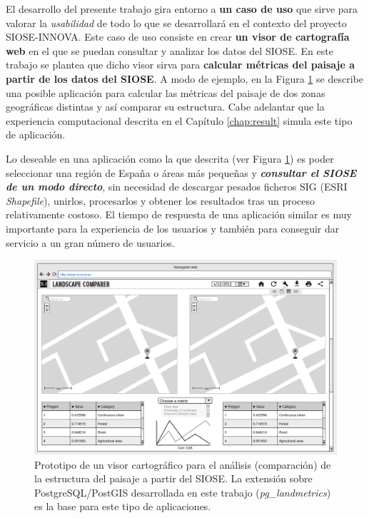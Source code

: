 \begin{prologo}
El desarrollo del presente trabajo gira entorno a \textbf{un caso de uso} que sirve para valorar la \textit{usabilidad} de todo lo que se desarrollará en el contexto del proyecto SIOSE-INNOVA. Este caso de uso consiste en crear \textbf{un visor de cartografía web} en el que se puedan consultar y analizar los datos del SIOSE. En este trabajo se plantea que dicho visor sirva para \textbf{calcular métricas del paisaje a partir de los datos del SIOSE}. A modo de ejemplo, en la Figura \ref{fig:visorweb} se describe una posible aplicación para calcular las métricas del paisaje de dos zonas geográficas distintas y así comparar su estructura. Cabe adelantar que la experiencia computacional descrita en el Capítulo \ref{chap:result} simula este tipo de aplicación.

Lo deseable en una aplicación como la que descrita (ver Figura \ref{fig:visorweb}) es poder seleccionar una región de España o áreas más pequeñas y \textbf{\textit{consultar el SIOSE de un modo directo}}, sin necesidad de descargar pesados ficheros SIG (ESRI \textit{Shapefile}), unirlos, procesarlos y obtener los resultados tras un proceso relativamente costoso. El tiempo de respuesta de una aplicación similar es muy importante para la experiencia de los usuarios y también para conseguir dar servicio a un gran número de usuarios.

\begin{figure}
\begin{center}
\includegraphics[width=\textwidth]{Prologo/Figs/visorweb.png}
\caption{Prototipo de un visor cartográfico para el análisis (comparación) de la estructura del paisaje a partir del SIOSE. La extensión sobre PostgreSQL/PostGIS desarrollada en este trabajo (\textit{pg\_landmetrics}) es la base para este tipo de aplicaciones. \label{fig:visorweb}}
\end{center}
\end{figure}


\end{prologo}
